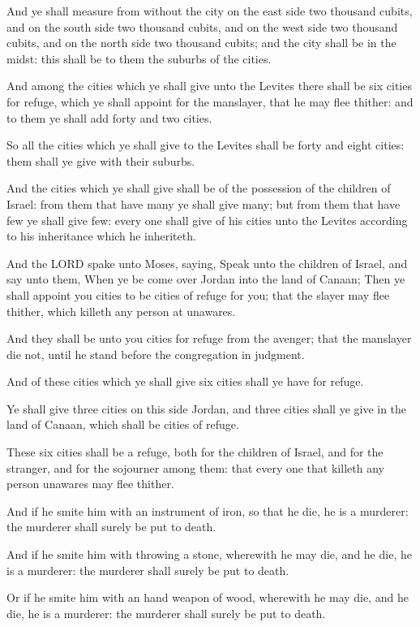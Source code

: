 \verse And ye shall measure from without the city on the east side two
thousand cubits, and on the south side two thousand cubits, and on the
west side two thousand cubits, and on the north side two thousand
cubits; and the city shall be in the midst: this shall be to them the
suburbs of the cities.

\verse And among the cities which ye shall give unto the Levites there
shall be six cities for refuge, which ye shall appoint for the
manslayer, that he may flee thither: and to them ye shall add forty
and two cities.

\verse So all the cities which ye shall give to the Levites shall be
forty and eight cities: them shall ye give with their suburbs.

\verse And the cities which ye shall give shall be of the possession of
the children of Israel: from them that have many ye shall give many;
but from them that have few ye shall give few: every one shall give of
his cities unto the Levites according to his inheritance which he
inheriteth.

\verse And the LORD spake unto Moses, saying, \verse Speak unto the
children of Israel, and say unto them, When ye be come over Jordan
into the land of Canaan; \verse Then ye shall appoint you cities to be
cities of refuge for you; that the slayer may flee thither, which
killeth any person at unawares.

\verse And they shall be unto you cities for refuge from the avenger;
that the manslayer die not, until he stand before the congregation in
judgment.

\verse And of these cities which ye shall give six cities shall ye have
for refuge.

\verse Ye shall give three cities on this side Jordan, and three cities
shall ye give in the land of Canaan, which shall be cities of refuge.

\verse These six cities shall be a refuge, both for the children of
Israel, and for the stranger, and for the sojourner among them: that
every one that killeth any person unawares may flee thither.

\verse And if he smite him with an instrument of iron, so that he die,
he is a murderer: the murderer shall surely be put to death.

\verse And if he smite him with throwing a stone, wherewith he may die,
and he die, he is a murderer: the murderer shall surely be put to
death.

\verse Or if he smite him with an hand weapon of wood, wherewith he may
die, and he die, he is a murderer: the murderer shall surely be put to
death.

